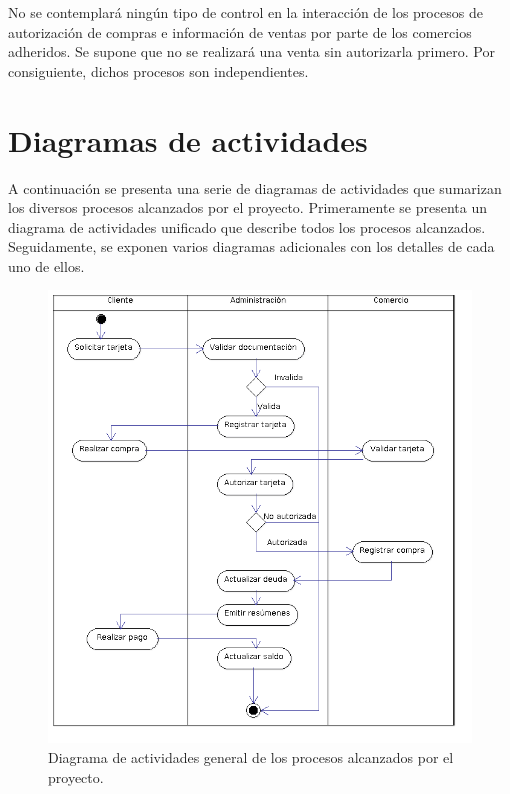 No se contemplará ningún tipo de control en la interacción de los procesos de
autorización de compras e información de ventas por parte de los comercios
adheridos. Se supone que no se realizará una venta sin autorizarla primero. Por
consiguiente, dichos procesos son independientes.

\section{Diagramas de actividades}

A continuación se presenta una serie de diagramas de actividades que sumarizan
los diversos procesos alcanzados por el proyecto. Primeramente se presenta un
diagrama de actividades unificado que describe todos los procesos alcanzados.
Seguidamente, se exponen varios diagramas adicionales con los detalles de cada
uno de ellos.

\begin{figure}[htb]
\begin{center}
\includegraphics[width=\textwidth]{images/mod_negocio_act_global.png}
\end{center}
\caption{Diagrama de actividades general de los procesos alcanzados por el
proyecto.}
\end{figure}

